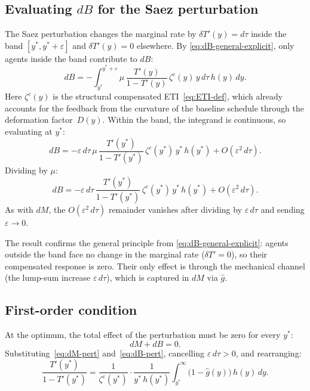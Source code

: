 \documentclass[12pt,a4paper]{article}
\theoremstyle{definition}
\theoremstyle{plain}
\theoremstyle{remark}
\begin{document}
\subsection{Evaluating $dB$ for the Saez perturbation}
\label{sec:behav}

The Saez perturbation changes the marginal rate by $\delta T'(y) = d\tau$ inside the band $[y^*, y^*+\varepsilon]$ and $\delta T'(y) = 0$ elsewhere. By \eqref{eq:dB-general-explicit}, only agents inside the band contribute to $dB$:
\[
  dB = -\int_{y^*}^{y^*+\varepsilon} \mu\,\frac{T'(y)}{1-T'(y)}\,\zeta^c(y)\,y\,d\tau\,h(y)\,dy.
\]
Here $\zeta^c(y)$ is the structural compensated ETI~\eqref{eq:ETI-def}, which already accounts for the feedback from the curvature of the baseline schedule through the deformation factor~$D(y)$.
Within the band, the integrand is continuous, so evaluating at $y^*$:
\[
  dB = -\varepsilon\,d\tau\,\mu\,\frac{T'(y^*)}{1-T'(y^*)}\,\zeta^c(y^*)\,y^*\,h(y^*) + O(\varepsilon^2\,d\tau).
\]
Dividing by $\mu$:
\begin{equation}
\label{eq:dB-pert}
  dB = -\varepsilon\,d\tau\,
  \frac{T'(y^*)}{1-T'(y^*)}\,
  \zeta^c(y^*)\,y^*\,h(y^*)
  + O(\varepsilon^2\,d\tau).
\end{equation}
As with $dM$, the $O(\varepsilon^2\,d\tau)$ remainder vanishes after dividing by $\varepsilon\,d\tau$ and sending $\varepsilon \to 0$.

The result confirms the general principle from \eqref{eq:dB-general-explicit}: agents outside the band face no change in the marginal rate ($\delta T' = 0$), so their compensated response is zero. Their only effect is through the mechanical channel (the lump-sum increase $\varepsilon\,d\tau$), which is captured in $dM$ via $\hat g$.

\subsection{First-order condition}

At the optimum, the total effect of the perturbation must be zero
for every $y^*$:
\[
  dM + dB = 0.
\]
Substituting~\eqref{eq:dM-pert} and~\eqref{eq:dB-pert}, cancelling
$\varepsilon\,d\tau>0$, and rearranging:
\begin{equation}
\label{eq:FOC-pert}
  \boxed{
  \frac{T'(y^*)}{1-T'(y^*)}
  = \frac{1}{\zeta^c(y^*)}
  \cdot \frac{1}{y^*\,h(y^*)}
  \int_{y^*}^{\infty}
  \bigl(1-\hat g(y)\bigr)\,h(y)\,dy.
  }
\end{equation}
\end{document}
